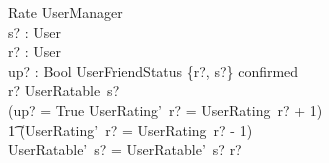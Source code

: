 \documentclass{article}
\begin{document}
\begin{schema}{Rate}
	\Delta UserManager\\
	s? : User\\
	r? : User\\
	up? : Bool
	\where
	UserFriendStatus \{r?, s?\} \mapsto confirmed\\
	r? \inbag UserRatable~s?\\
	(up? = True \land UserRating'~r? = UserRating~r? + 1) \lor\\
	\t1 (UserRating'~r? = UserRating~r? - 1)\\
	UserRatable'~s? = UserRatable'~s? \cup \lbag r? \rbag\\
\end{schema}
\end{document}
